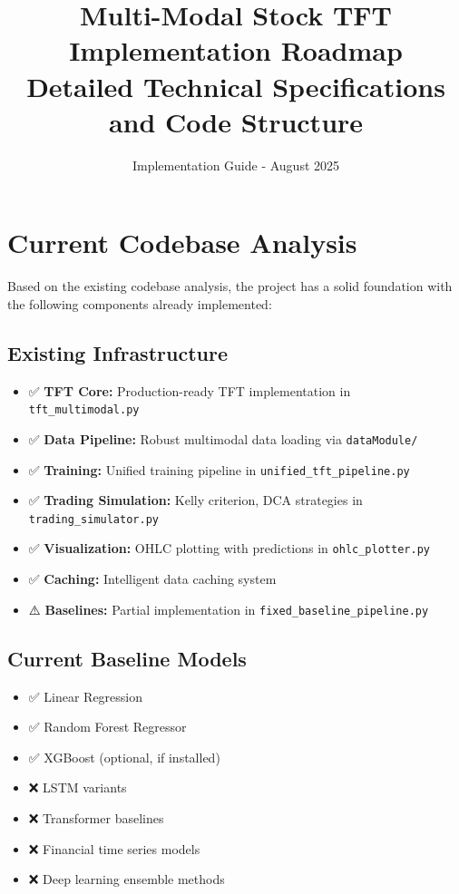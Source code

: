 \documentclass[11pt]{article}
\title{\textbf{Multi-Modal Stock TFT Implementation Roadmap} \\ 
       \large{Detailed Technical Specifications and Code Structure}}
\author{Implementation Guide - August 2025}
\date{}
\begin{document}
\maketitle

\section{Current Codebase Analysis}

Based on the existing codebase analysis, the project has a solid foundation with the following components already implemented:

\subsection{Existing Infrastructure}
\begin{itemize}
    \item ✅ \textbf{TFT Core:} Production-ready TFT implementation in \texttt{tft\_multimodal.py}
    \item ✅ \textbf{Data Pipeline:} Robust multimodal data loading via \texttt{dataModule/}
    \item ✅ \textbf{Training:} Unified training pipeline in \texttt{unified\_tft\_pipeline.py}
    \item ✅ \textbf{Trading Simulation:} Kelly criterion, DCA strategies in \texttt{trading\_simulator.py}
    \item ✅ \textbf{Visualization:} OHLC plotting with predictions in \texttt{ohlc\_plotter.py}
    \item ✅ \textbf{Caching:} Intelligent data caching system
    \item ⚠️ \textbf{Baselines:} Partial implementation in \texttt{fixed\_baseline\_pipeline.py}
\end{itemize}

\subsection{Current Baseline Models}
\begin{itemize}
    \item ✅ Linear Regression
    \item ✅ Random Forest Regressor
    \item ✅ XGBoost (optional, if installed)
    \item ❌ LSTM variants
    \item ❌ Transformer baselines
    \item ❌ Financial time series models
    \item ❌ Deep learning ensemble methods
\end{itemize}
\end{document}
